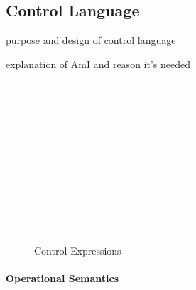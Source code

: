 \subsection{Control Language}
\label{sec:control-lang}

\todo purpose and design of control language

\todo explanation of AmI and reason it's needed

\begin{figure}[h]
  \begin{syntax}
     \alternative{\CtrlFail}     \\
     \alternative{\RecvFrom{\ell}} \\
    \\
     \\
     \\
      \\
    \\
    \\
    \\
    \\
    \\

    \category[Systems]{\Pi}
  \end{syntax}

  \caption{Control Expressions}
  \label{fig:control-lang-syntax}
\end{figure}

\paragraph{Operational Semantics}
\label{sec:control-lang-semantics}


